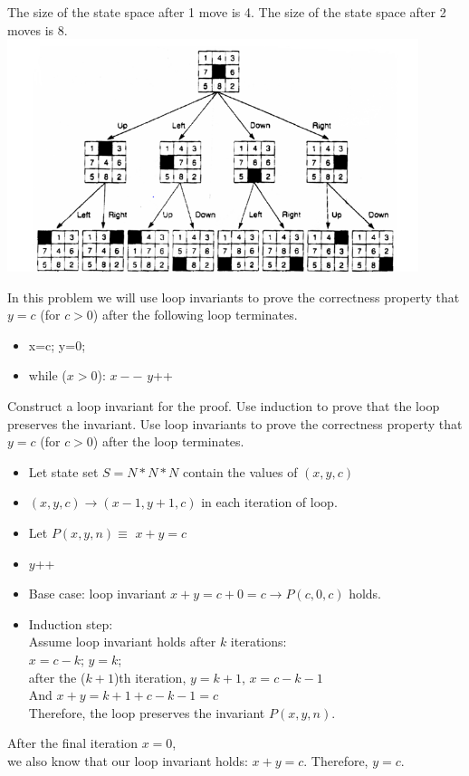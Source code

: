 \documentclass[solution, letterpaper]{cs20inclass}
\begin{document}
\begin{solution}
\subsolution The size of the state space after 1 move is 4.
\subsolution The size of the state space after 2 moves is 8.\\
\includegraphics[width=12cm]{final8}
\end{solution}

\problem In this problem we will use loop invariants to prove the correctness property that $y=c$ (for $c>0$) after the following loop terminates.
\begin{itemize}
\item x=c; y=0;
\item while ($x>0$):
\subitem $x--$
\subitem $y$++
\end{itemize}
\subproblem Construct a loop invariant for the proof.
\subproblem Use induction to prove that the loop preserves the invariant.
\subproblem Use loop invariants to prove the correctness property that $y=c$ (for $c>0$) after the loop terminates.

\begin{solution}
\subsolution
\begin{itemize}
\item Let state set $S=N*N*N$ contain the values of $(x, y, c)$
\item $(x,y,c) \rightarrow (x-1, y+1, c)$  in each iteration of loop.
\item Let $P(x,y,n)\equiv$ $x+y=c$ 
\item $y$++
\end{itemize}
\subsolution
\begin{itemize}
\item Base case: loop invariant $x+y=c+0=c \rightarrow P(c,0,c)$ holds.
\item Induction step: \\
Assume loop invariant holds after $k$ iterations:\\
$x=c-k$; $y=k$;\\
after the ($k+1$)th iteration, $y=k+1$, $x=c-k-1$\\
And $x+y=k+1+c-k-1=c$\\
Therefore, the loop preserves the invariant $P(x,y,n)$.
\end{itemize}
\subsolution
After the final iteration $x=0$,\\
we also know that our loop invariant holds: $x+y=c$. Therefore, $y=c$.
\end{solution}
\end{document}
